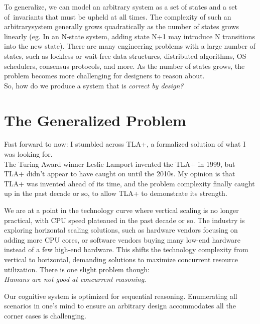 To generalize, we can model an arbitrary system as a set of states and a set of invariants that must be upheld at all times. The complexity of such an arbitrarysystem generally grows quadratically as the number of states grows linearly (eg.
In an N-state system, adding state N+1 may introduce N transitions into the new
state). There are many engineering problems with a large number of states, such
as lockless or wait-free data structures, distributed algorithms, OS schedulers,
consensus protocols, and more. As the number of states grows, the problem becomes
more challenging for designers to reason about.\\

So, how do we produce a system that is \textit{correct by design?} 

\section{The Generalized Problem}

Fast forward to now: I stumbled across TLA+, a formalized solution of what I
was looking for.\\

The Turing Award winner Leslie Lamport invented the TLA+ in 1999, but TLA+
didn't appear to have caught on until the 2010s. My opinion is that TLA+ was
invented ahead of its time, and the problem complexity finally caught up in the
past decade or so, to allow TLA+ to demonstrate its strength.\newline

We are at a point in the technology curve where vertical scaling is no
longer practical, with CPU speed plateaued in the past decade or so. The industry
is exploring horizontal scaling solutions, such as hardware vendors focusing on
adding more CPU cores, or software vendors buying many low-end hardware instead
of a few high-end hardware. This shifts the technology complexity from vertical
to horizontal, demanding solutions to maximize concurrent resource
utilization. There is one slight problem though:\\

\textit{Humans are not good at concurrent reasoning}. \newline

Our cognitive system is optimized for sequential reasoning. Enumerating
all scenarios in one's mind to ensure an arbitrary design accommodates all
the corner cases is challenging.\newline

